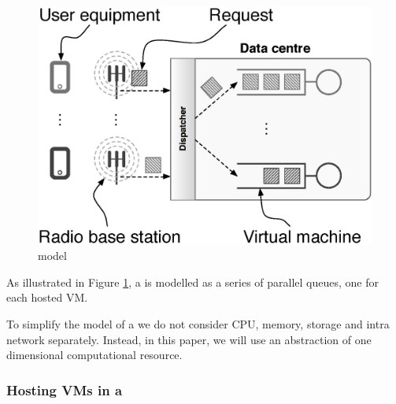 \subsection{\Dc}
\begin{figure}[tb]
	\centering
	\includegraphics[width=\linewidth]{fig_dc_model.eps} 
	\caption{\Dc{} model}
	\label{fig:dc_model}
\end{figure}

As illustrated in Figure \ref{fig:dc_model}, a \dc{} is modelled as a series of parallel queues, one for each hosted VM.

To simplify the model of a \dc{} we do not consider CPU, memory, storage and intra \dc{} network separately.
Instead, in this paper, we will use an abstraction of one dimensional computational resource.

\subsubsection{Hosting VMs in a \dc{}}

